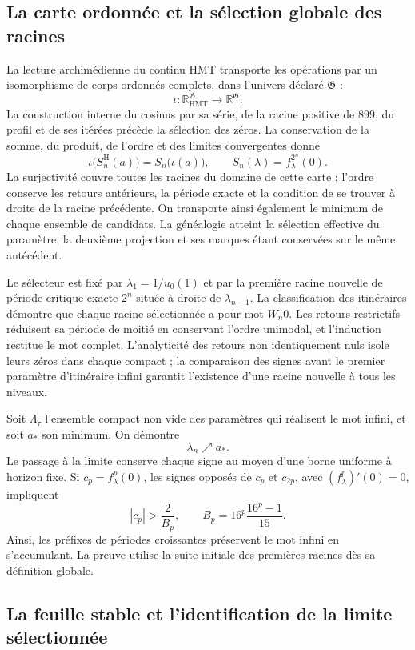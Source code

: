 \subsection{La carte ordonnée et la sélection globale des racines}

La lecture archimédienne du continu HMT transporte les opérations
par un isomorphisme de corps ordonnés complets, dans l’univers
déclaré \(\mathfrak G\) :
\[
\iota:\mathbb R_{\mathrm{HMT}}^{\mathfrak G}
\longrightarrow\mathbb R^{\mathfrak G}.
\]
La construction interne du cosinus par sa série, de la racine positive de 899,
du profil et de ses itérées précède la sélection des zéros. La conservation
de la somme, du produit, de l’ordre et des limites convergentes donne
\[
\iota\bigl(S_n^{\mathrm H}(a)\bigr)=S_n\bigl(\iota(a)\bigr),
\qquad S_n(\lambda)=f_\lambda^{2^n}(0).
\]
La surjectivité couvre toutes les racines du domaine de cette carte ; l’ordre
conserve les retours antérieurs, la période exacte et la condition de
se trouver à droite de la racine précédente. On transporte ainsi
également le minimum de chaque ensemble de candidats. La généalogie atteint
la sélection effective du paramètre, la deuxième projection et ses
marques étant conservées sur le même antécédent.

Le sélecteur est fixé par \(\lambda_1=1/u_0(1)\) et par la première racine
nouvelle de période critique exacte \(2^n\) située à droite de
\(\lambda_{n-1}\). La classification des itinéraires démontre que chaque racine
sélectionnée a pour mot \(W_n0\). Les retours restrictifs réduisent sa
période de moitié en conservant l’ordre unimodal, et l’induction restitue
le mot complet. L’analyticité des retours non identiquement nuls
isole leurs zéros dans chaque compact ; la
comparaison des signes avant le premier paramètre d’itinéraire infini
garantit l’existence d’une racine nouvelle à tous les niveaux.

Soit \(\Lambda_\tau\) l’ensemble compact non vide des paramètres qui réalisent
le mot infini, et soit \(a_*\) son minimum. On démontre
\[
\lambda_n\nearrow a_*.
\]
Le passage à la limite conserve chaque signe au moyen d’une borne uniforme à horizon
fixe. Si \(c_p=f_\lambda^p(0)\), les signes opposés de \(c_p\) et
\(c_{2p}\), avec \((f_\lambda^p)'(0)=0\), impliquent
\[
|c_p|>\frac2{B_p},\qquad
B_p=16^p\frac{16^p-1}{15}.
\]
Ainsi, les préfixes de périodes croissantes préservent le mot infini en
s’accumulant. La preuve utilise la suite initiale des premières racines dès
sa définition globale.

\subsection{La feuille stable et l’identification de la limite sélectionnée}


